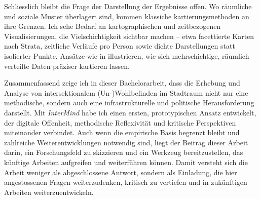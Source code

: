 Schliesslich bleibt die Frage der Darstellung der Ergebnisse offen. Wo räumliche und soziale Muster überlagert sind, kommen klassiche kartierungsmethoden an ihre Grenzen. Ich sehe Bedarf an kartographischen und zeitbezogenen Visualisierungen, die Vielschichtigkeit sichtbar machen -- etwa facettierte Karten nach Strata, zeitliche Verläufe pro Person sowie dichte Darstellungen statt isolierter Punkte. Ansätze wie in \textcite{friebelThermischesEmpfindenUnd2024} illustrieren, wie sich mehrschichtige, räumlich verteilte Daten präziser kartieren lassen.

Zusammenfassend zeige ich in dieser Bachelorarbeit, dass die Erhebung und Analyse von intersektionalem (Un-)Wohlbefinden im Stadtraum nicht nur eine methodische, sondern auch eine infrastrukturelle und politische Herausforderung darstellt. Mit \textit{InterMind} habe ich einen ersten, prototypischen Ansatz entwickelt, der digitale Offenheit, methodische Reflexivität und kritische Perspektiven miteinander verbindet. Auch wenn die empirische Basis begrenzt bleibt und zahlreiche Weiterentwicklungen notwendig sind, liegt der Beitrag dieser Arbeit darin, ein Forschungsfeld zu skizzieren und ein Werkzeug bereitzustellen, das künftige Arbeiten aufgreifen und weiterführen können. Damit versteht sich die Arbeit weniger als abgeschlossene Antwort, sondern als Einladung, die hier angestossenen Fragen weiterzudenken, kritisch zu vertiefen und in zukünftigen Arbeiten weiterzuentwickeln.




